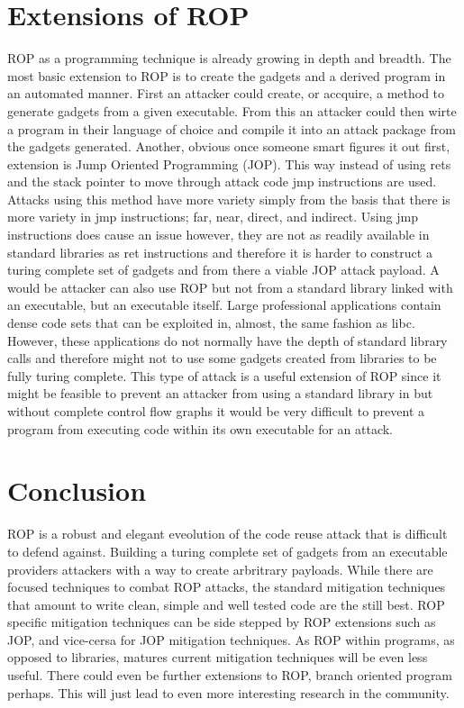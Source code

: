 \documentclass[11pt]{amsart}
\begin{document}
\section*{Extensions of ROP}
ROP as a programming technique is already growing in depth and breadth. The most basic extension to ROP is to create the gadgets and a derived program in an automated manner. First an attacker could create, or accquire, a method to generate gadgets from a given executable. From this an attacker could then wirte a program in their language of choice and compile it into an attack package from the gadgets generated.\newline
Another, obvious once someone smart figures it out first, extension is Jump Oriented Programming (JOP). This way instead of using rets and the stack pointer to move through attack code jmp instructions are used. Attacks using this method have more variety simply from the basis that there is more variety in jmp instructions; far, near, direct, and indirect. Using jmp instructions does cause an issue however, they are not as readily available in standard libraries as ret instructions and therefore it is harder to construct a turing complete set of gadgets and from there a viable JOP attack payload.\newline
A would be attacker can also use ROP but not from a standard library linked with an executable, but an executable itself. Large professional applications contain dense code sets that can be exploited in, almost, the same fashion as libc. However, these applications do not normally have the depth of standard library calls and therefore might not to use some gadgets created from libraries to be fully turing complete. This type of attack is a useful extension of ROP since it might be feasible to prevent an attacker from using a standard library in but without complete control flow graphs it would be very difficult to prevent a program from executing code within its own executable for an attack.
\section*{Conclusion}
ROP is a robust and elegant eveolution of the code reuse attack that is difficult to defend against. Building a turing complete set of gadgets from an executable providers attackers with a way to create arbritrary payloads.  While there are focused techniques to combat ROP attacks, the standard mitigation techniques that amount to write clean, simple and well tested code are the still best. ROP specific mitigation techniques can be side stepped by ROP extensions such as JOP, and vice-cersa for JOP mitigation techniques. As ROP within programs, as opposed to libraries, matures current mitigation techniques will be even less useful. There could even be further extensions to ROP, branch oriented program perhaps.  This will just lead to even more interesting research in the community.
\end{document}
